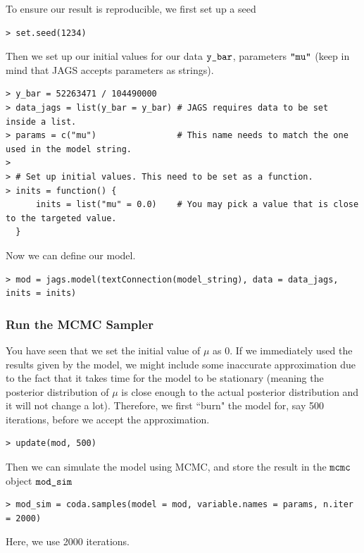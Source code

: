 \documentclass{article}
\begin{document}
To ensure our result is reproducible, we first set up a seed
\begin{lstlisting}
> set.seed(1234)
\end{lstlisting}

Then we set up our initial values for our data $\verb|y_bar|$, parameters $\verb|"mu"|$ (keep in mind that JAGS accepts parameters as strings).

\begin{lstlisting}
> y_bar = 52263471 / 104490000
> data_jags = list(y_bar = y_bar) # JAGS requires data to be set inside a list.
> params = c("mu")                # This name needs to match the one used in the model string.
>
> # Set up initial values. This need to be set as a function.
> inits = function() {
      inits = list("mu" = 0.0)    # You may pick a value that is close to the targeted value.
  }
\end{lstlisting}

Now we can define our model.

\begin{lstlisting}
> mod = jags.model(textConnection(model_string), data = data_jags, inits = inits)
\end{lstlisting}

\subsubsection*{Run the MCMC Sampler}

You have seen that we set the initial value of $\mu$ as 0. If we immediately used the results given by the model, we might include some inaccurate approximation due to the fact that it takes time for the model to be stationary (meaning the posterior distribution of $\mu$ is close enough to the actual posterior distribution and it will not change a lot). Therefore, we first ``burn" the model for, say 500 iterations, before we accept the approximation. 

\begin{lstlisting}
> update(mod, 500)
\end{lstlisting}

Then we can simulate the model using MCMC, and store the result in the $\verb|mcmc|$ object $\verb|mod_sim|$

\begin{lstlisting}
> mod_sim = coda.samples(model = mod, variable.names = params, n.iter = 2000)
\end{lstlisting}
Here, we use 2000 iterations. \\
\end{document}
